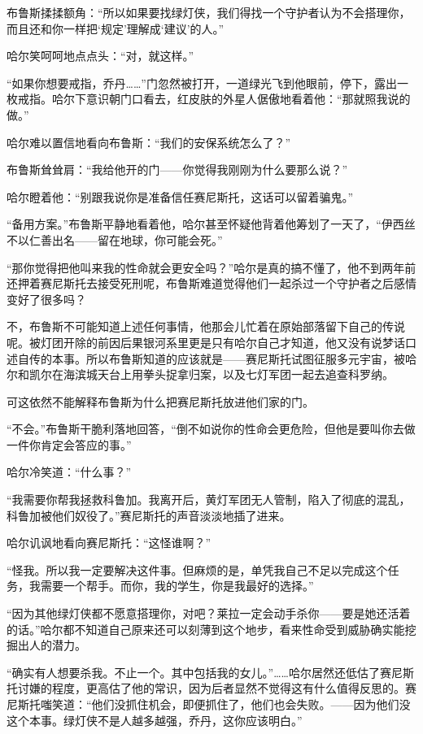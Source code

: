 \documentclass[../main]{subfiles}
\begin{document}
布鲁斯揉揉额角：“所以如果要找绿灯侠，我们得找一个守护者认为不会搭理你，而且还和你一样把`规定'理解成`建议'的人。”

哈尔笑呵呵地点点头：“对，就这样。”

“如果你想要戒指，乔丹\ldots\ldots”门忽然被打开，一道绿光飞到他眼前，停下，露出一枚戒指。哈尔下意识朝门口看去，红皮肤的外星人倨傲地看着他：“那就照我说的做。”

哈尔难以置信地看向布鲁斯：“我们的安保系统怎么了？”

布鲁斯耸耸肩：“我给他开的门——你觉得我刚刚为什么要那么说？”

哈尔瞪着他：“别跟我说你是准备信任赛尼斯托，这话可以留着骗鬼。”

“备用方案。”布鲁斯平静地看着他，哈尔甚至怀疑他背着他筹划了一天了，“伊西丝不以仁善出名——留在地球，你可能会死。”

“那你觉得把他叫来我的性命就会更安全吗？”哈尔是真的搞不懂了，他不到两年前还押着赛尼斯托去接受死刑呢，布鲁斯难道觉得他们一起杀过一个守护者之后感情变好了很多吗？

不，布鲁斯不可能知道上述任何事情，他那会儿忙着在原始部落留下自己的传说呢。被灯团开除的前因后果银河系里更是只有哈尔自己才知道，他又没有说梦话口述自传的本事。所以布鲁斯知道的应该就是——赛尼斯托试图征服多元宇宙，被哈尔和凯尔在海滨城天台上用拳头捉拿归案，以及七灯军团一起去追查科罗纳。

可这依然不能解释布鲁斯为什么把赛尼斯托放进他们家的门。

“不会。”布鲁斯干脆利落地回答，“倒不如说你的性命会更危险，但他是要叫你去做一件你肯定会答应的事。”

哈尔冷笑道：“什么事？”

“我需要你帮我拯救科鲁加。我离开后，黄灯军团无人管制，陷入了彻底的混乱，科鲁加被他们奴役了。”赛尼斯托的声音淡淡地插了进来。

哈尔讥讽地看向赛尼斯托：“这怪谁啊？”

“怪我。所以我一定要解决这件事。但麻烦的是，单凭我自己不足以完成这个任务，我需要一个帮手。而你，我的学生，你是我最好的选择。”

“因为其他绿灯侠都不愿意搭理你，对吧？莱拉一定会动手杀你——要是她还活着的话。”哈尔都不知道自己原来还可以刻薄到这个地步，看来性命受到威胁确实能挖掘出人的潜力。

“确实有人想要杀我。不止一个。其中包括我的女儿。”……哈尔居然还低估了赛尼斯托讨嫌的程度，更高估了他的常识，因为后者显然不觉得这有什么值得反思的。赛尼斯托嗤笑道：“他们没抓住机会，即便抓住了，他们也会失败。——因为他们没这个本事。绿灯侠不是人越多越强，乔丹，这你应该明白。”
\end{document}
